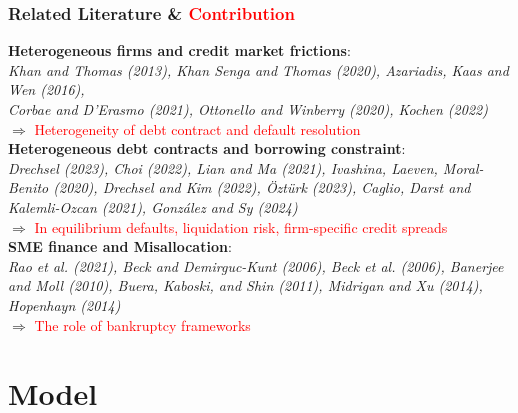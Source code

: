 \documentclass[aspectratio=169,xcolor=table]{beamer}
\begin{document}
\begin{frame}[label=lit] \frametitle{Related Literature \& \textcolor{red}{Contribution} }

\textbf{Heterogeneous firms and credit market frictions}: \\
\footnotesize \textit{Khan and Thomas (2013), Khan Senga and Thomas (2020), Azariadis, Kaas and Wen (2016), \\ Corbae and D'Erasmo (2021), Ottonello and Winberry (2020), Kochen (2022)} \normalsize \\ 
\qquad $\Rightarrow$ \textcolor{red}{Heterogeneity of debt contract and default resolution} \vspace{3mm} \\

\textbf{Heterogeneous debt contracts and borrowing constraint}: \\
\footnotesize \textit{Drechsel (2023), Choi (2022), Lian and Ma (2021), Ivashina, Laeven, Moral-Benito (2020), Drechsel and Kim (2022), Öztürk (2023), Caglio, Darst and Kalemli-Ozcan (2021), González and Sy (2024)} \normalsize \\ 
\qquad $\Rightarrow$ \textcolor{red}{In equilibrium defaults, liquidation risk, firm-specific credit spreads} \vspace{3mm} \\

\textbf{SME finance and Misallocation}: \\
\footnotesize \textit{Rao et al. (2021), Beck and Demirguc-Kunt (2006), Beck et al. (2006), Banerjee and Moll (2010), Buera, Kaboski, and Shin (2011), Midrigan and Xu (2014), Hopenhayn (2014)} \\ \normalsize 
\qquad $\Rightarrow$ \textcolor{red}{The role of bankruptcy frameworks}

\end{frame} 



\section{Model}
\end{document}
